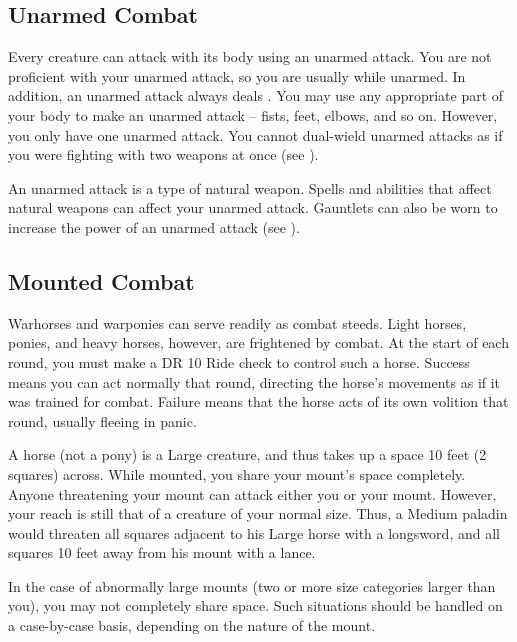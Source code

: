     \subsection{Unarmed Combat}\label{Unarmed Combat}
        Every creature can attack with its body using an unarmed attack.
        You are not proficient with your unarmed attack, so you are usually  while unarmed.
        In addition, an unarmed attack always deals .
        You may use any appropriate part of your body to make an unarmed attack -- fists, feet, elbows, and so on.
        However, you only have one unarmed attack.
        You cannot dual-wield unarmed attacks as if you were fighting with two weapons at once (see ).

        An unarmed attack is a type of natural weapon.
        Spells and abilities that affect natural weapons can affect your unarmed attack.
        Gauntlets can also be worn to increase the power of an unarmed attack (see ).

    \subsection{Mounted Combat}\label{Mounted Combat}
         Warhorses and warponies can serve readily as combat steeds. Light horses, ponies, and heavy horses, however, are frightened by combat.
        At the start of each round, you must make a DR 10 Ride check to control such a horse.
        Success means you can act normally that round, directing the horse's movements as if it was trained for combat.
        Failure means that the horse acts of its own volition that round, usually fleeing in panic.

         A horse (not a pony) is a Large creature, and thus takes up a space 10 feet (2 squares) across. While mounted, you share your mount's space completely. Anyone threatening your mount can attack either you or your mount. However, your reach is still that of a creature of your normal size. Thus, a Medium paladin would threaten all squares adjacent to his Large horse with a longsword, and all squares 10 feet away from his mount with a lance.

        In the case of abnormally large mounts (two or more size categories larger than you), you may not completely share space. Such situations should be handled on a case-by-case basis, depending on the nature of the mount.

